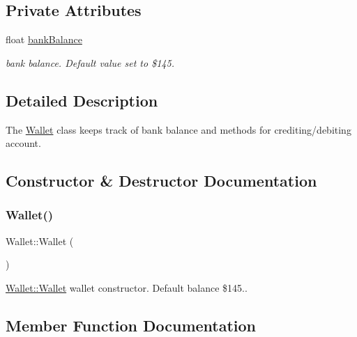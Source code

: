 \subsection*{Private Attributes}
\begin{DoxyCompactItemize}
\item 
float \hyperlink{classWallet_a586fc4e3fb0e9ce59e5bbafd9145d319}{bank\+Balance}
\begin{DoxyCompactList}\small\item\em bank balance. Default value set to \$145. \end{DoxyCompactList}\end{DoxyCompactItemize}


\subsection{Detailed Description}
The \hyperlink{classWallet}{Wallet} class keeps track of bank balance and methods for crediting/debiting account. 

\subsection{Constructor \& Destructor Documentation}
\mbox{\label{classWallet_ad9be9e49244b78db9099fcaeccd1af04}} 
\subsubsection{\texorpdfstring{Wallet()}{Wallet()}}
{\footnotesize\ttfamily Wallet\+::\+Wallet (\begin{DoxyParamCaption}{ }\end{DoxyParamCaption})}



\hyperlink{classWallet_ad9be9e49244b78db9099fcaeccd1af04}{Wallet\+::\+Wallet} wallet constructor. Default balance \$145.. 



\subsection{Member Function Documentation}
\mbox{\label{classWallet_a69b488bc31201592bb860b6fdaafa1b8}} 
